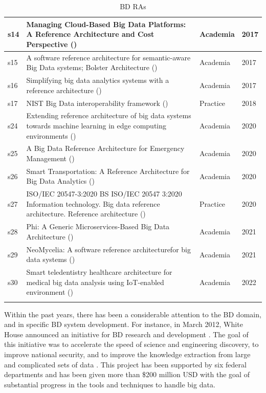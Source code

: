 \documentclass[review]{elsarticle}
\begin{document}
\begin{longtable}{ |p{0.5cm}|p{6.5cm}|p{1.5cm}|p{0.8cm}| }
    \hline
    s14 & Managing Cloud-Based Big Data Platforms: A Reference Architecture and Cost Perspective (\cite{heilig2017managing}) & Academia  &  2017   \\
    \hline
    s15 & A software reference architecture for semantic-aware Big Data systems; Bolster Architecture (\cite{Nadal}) & Academia  &  2017   \\
    \hline
    s16 & Simplifying big data analytics systems with a reference architecture (\cite{sang2017simplifying}) & Academia  &  2017   \\
    \hline
    s17 & NIST Big Data interoperability framework (\cite{Chang}) & Practice  &  2018  \\
    \hline
    s24 & Extending reference architecture of big data systems towards machine learning in edge computing environments (\cite{paakkonen2020extending})  & Academia & 2020   \\
    \hline
    s25 & A Big Data Reference Architecture for Emergency Management (\cite{iglesias2020big})  & Academia & 2020   \\
    \hline
    s26 & Smart Transportation: A Reference Architecture for Big Data Analytics (\cite{castellanos2021smart})  & Academia & 2020   \\
    \hline
    s27 & ISO/IEC 20547-3:2020 BS ISO/IEC 20547 3:2020 Information technology. Big data reference architecture. Reference architecture (\cite{ISO20547}) & Practice  &  2020  \\
    \hline
    s28 & Phi: A Generic Microservices-Based Big Data Architecture (\cite{maamouri2021phi})  & Academia & 2021   \\
    \hline
    s29 & NeoMycelia: A software reference architecturefor big data systems (\cite{AtaeiApsec})  & Academia & 2021   \\
    \hline
    s30 & Smart teledentistry healthcare architecture for medical big data analysis using IoT-enabled environment (\cite{babar2022smart})  & Academia & 2022   \\
    \hline
    \caption{BD RAs}
    \label{table:bdRAs}
\end{longtable}

Within the past years, there has been a considerable attention to the BD domain, and in specific BD system development. For instance, in March 2012, White House announced an initiative for BD research and development \cite{House}. The goal of this initiative was to accelerate the speed of science and engineering discovery, to improve national security, and to improve the knowledge extraction from large and complicated sets of data \cite{chang2015nist}. This project has been supported by six federal departments and has been given more than \$200 million USD with the goal of substantial progress in the tools and techniques to handle big data.
\end{document}
